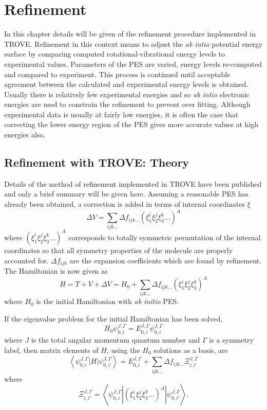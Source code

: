 

\chapter{Refinement}
\label{chap:refine}

In this chapter details will be given of the refinement procedure implemented in TROVE. 
Refinement in this context means to adjust the \textit{ab intio} potential energy 
surface by comparing computed rotational-vibrational energy levels to experimental values. 
Parameters of the PES are varied, energy levels re-computed and compared to experiment.
This process is continued until acceptable agreement between the calculated and experimental energy levels is obtained. 
Usually there is relatively few experimental energies
and so \textit{ab intio} electronic energies are used to constrain the refinement to prevent over fitting. 
Although experimental data is usually at fairly low energies, it is often the case that correcting the lower energy 
region of the PES gives more accurate values at high energies also. 

\section{Refinement with TROVE: Theory}
Details of the method of refinement implemented in TROVE have been published\cite{jt503} and only a brief summary 
will be given here. Assuming a reasonable PES has
already been obtained, a correction is added in terms of internal coordinates $\xi$
\begin{equation}
 \Delta V = \sum_{ijk...} \Delta f_{ijk...} \left(\xi_1^i \xi_2^j \xi_3^k ...\right)^A
\end{equation}
where $\left(\xi_1^i \xi_2^j \xi_3^k ... \right)^A$ corresponds to totally symmetric permutation of the internal coordinates 
so that all symmetry properties
of the molecule are properly accounted for. $\Delta f_{ijk}$ are the expansion coefficients which are found by refinement. 
The Hamiltonian is now given as
\begin{equation}
 H = T + V + \Delta V = H_0 + \sum_{ijk...} \Delta f_{ijk...} \left(\xi_1^i \xi_2^j \xi_3^k \right)^A
\end{equation}
where $H_0$ is the initial Hamiltonian with \textit{ab initio} PES. 

If the eigenvalue problem for the initial Hamiltonian has been solved,
\begin{equation}
 H_0 \psi^{J,\Gamma}_{0,i} = E^{J,\Gamma}_{0,i} \psi^{J,\Gamma}_{0,i}
\end{equation}
where $J$ is the total angular momentum quantum number and $\Gamma$ is a symmetry label, then matrix elements of $H$, 
using the $H_0$ solutions as a basis, are
\begin{equation}
 \left< \psi^{J,\Gamma}_{0,i} | H |\psi^{J,\Gamma}_{0,i'}   \right> = E^{J,\Gamma}_{0,i} + \sum_{ijk...} \Delta f_{ijk...} \Xi_{i,i'}^{J, \Gamma}
\end{equation}
where 
\begin{equation}
 \Xi_{i,i'}^{J, \Gamma} = \left< \psi^{J,\Gamma}_{0,i} | \left(\xi_1^i \xi_2^j \xi_3^k ...\right)^A | \psi^{J,\Gamma}_{0,i'} \right>.
\end{equation}

